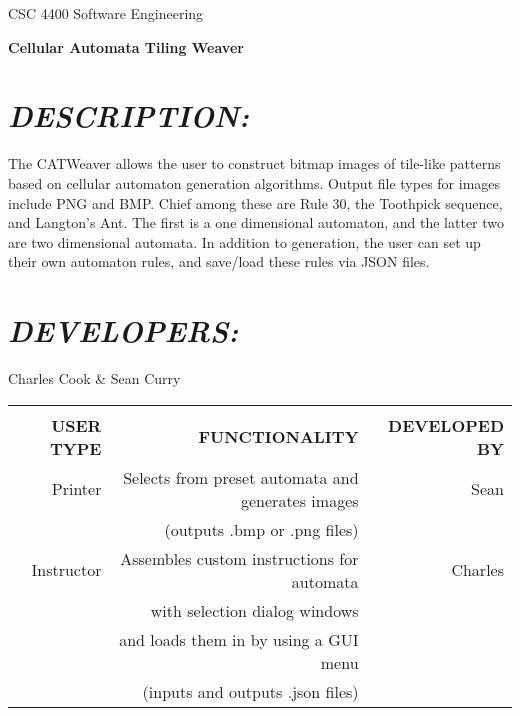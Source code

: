 \documentclass[12pt]{article}
\begin{document}
	\begin{Center}
		CSC 4400 Software Engineering
		\linebreak

		\LARGE
		\textbf{Cellular Automata Tiling Weaver}
	\end{Center}

	\begin{FlushLeft}
		\section*{\textit{DESCRIPTION:}}
		The CATWeaver allows the user to construct bitmap images of tile-like patterns based on cellular automaton generation algorithms. Output file types for images include PNG and BMP. Chief among these are Rule 30, the Toothpick sequence, and Langton's Ant. The first is a one dimensional automaton, and the latter two are two dimensional automata. In addition to generation, the user can set up their own automaton rules, and save/load these rules via JSON files.
		\section*{\textit{DEVELOPERS:}}
		Charles Cook \& Sean Curry
		\linebreak \linebreak

		\begin{tabular}{|r|r|r|}
			\hline & & \\
			\large \textbf{USER TYPE} & \large \textbf{FUNCTIONALITY} & \large \textbf{DEVELOPED BY}
			\\ \hline
			Printer & Selects from preset automata and generates images & Sean
			\\
			& (outputs .bmp or .png files) &
			\\ \hline
			Instructor & Assembles custom instructions for automata & Charles
			\\
			& with selection dialog windows &
			\\
			& and loads them in by using a GUI menu &
			\\
			& (inputs and outputs .json files) &
			\\ \hline
		\end{tabular}


\end{FlushLeft}
\end{document}
